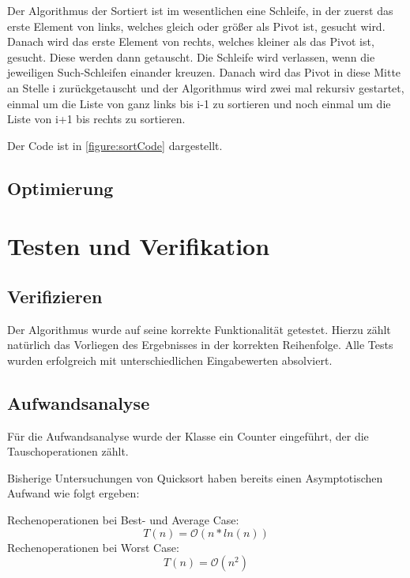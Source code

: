 \documentclass[11pt]{scrartcl}
\begin{document}
		Der Algorithmus der Sortiert ist im wesentlichen eine Schleife, in der zuerst das erste Element von links, welches gleich oder größer als Pivot ist, gesucht wird.
		Danach wird das erste Element von rechts, welches kleiner als das Pivot ist, gesucht. Diese werden dann getauscht.
		Die Schleife wird verlassen, wenn die jeweiligen Such-Schleifen einander kreuzen.
		Danach wird das Pivot in diese Mitte an Stelle i zurückgetauscht und der Algorithmus wird zwei mal rekursiv gestartet,
		einmal um die Liste von ganz links bis i-1 zu sortieren und noch einmal um die Liste von i+1 bis rechts zu sortieren.

		Der Code ist in \ref{figure:sortCode} dargestellt.

	\subsection{Optimierung}
		\label{sec:optAlgo}


\section{Testen und Verifikation}
\label{sec:vertests}

	\subsection{Verifizieren}
		\label{sec:veri}
		
		Der Algorithmus wurde auf seine korrekte Funktionalität getestet.
		Hierzu zählt natürlich das Vorliegen des Ergebnisses in der korrekten Reihenfolge.
		Alle Tests wurden erfolgreich mit unterschiedlichen Eingabewerten absolviert.
	
	\subsection{Aufwandsanalyse}
		\label{sec:aufwand}
		
		Für die Aufwandsanalyse wurde der Klasse ein Counter eingeführt, der die Tauschoperationen zählt. 
		
		Bisherige Untersuchungen von Quicksort haben bereits einen Asymptotischen Aufwand wie folgt ergeben:

		Rechenoperationen bei Best- und Average Case:
		\begin{equation*}
		T(n) = \mathcal{O}(n*ln(n))
		\end{equation*}
		Rechenoperationen bei Worst Case:
		\begin{equation*}
		T(n) = \mathcal{O}(n^{2})
		\end{equation*}
\end{document}
